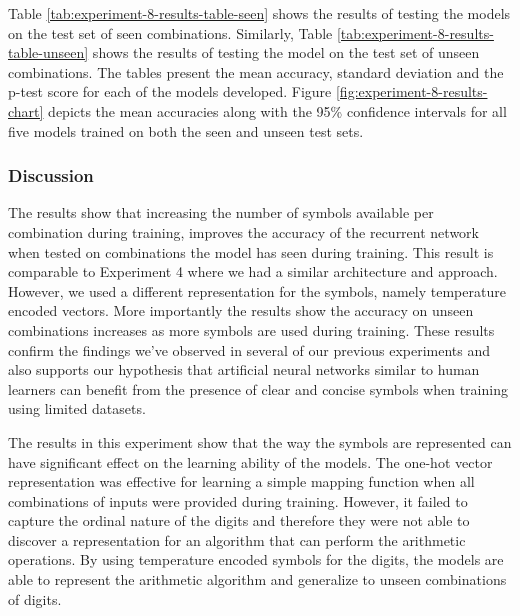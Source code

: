 Table \ref{tab:experiment-8-results-table-seen} shows the results of testing the models on the test set of seen combinations. Similarly, Table \ref{tab:experiment-8-results-table-unseen} shows the results of testing the model on the test set of unseen combinations. The tables present the mean accuracy, standard deviation and the p-test score for each of the models developed. Figure \ref{fig:experiment-8-results-chart} depicts the mean accuracies along with the 95\% confidence intervals for all five models trained on both the seen and unseen test sets.

\subsubsection{Discussion}

The results show that increasing the number of symbols available per combination during training, improves the accuracy of the recurrent network when tested on combinations the model has seen during training. This result is comparable to Experiment 4 where we had a similar architecture and approach. However, we used a different representation for the symbols, namely temperature encoded vectors. More importantly the results show the accuracy on unseen combinations increases as more symbols are used during training. These results confirm the findings we've observed in several of our previous experiments and also supports our hypothesis that artificial neural networks similar to human learners can benefit from the presence of clear and concise symbols when training using limited datasets.

The results in this experiment show that the way the symbols are represented can have significant effect on the learning ability of the models. The one-hot vector representation was effective for learning a simple mapping function when all combinations of inputs were provided during training. However, it failed to capture the ordinal nature of the digits and therefore they were not able to discover a representation for an algorithm that can perform the arithmetic operations. By using temperature encoded symbols for the digits, the models are able to represent the arithmetic algorithm and generalize to unseen combinations of digits.